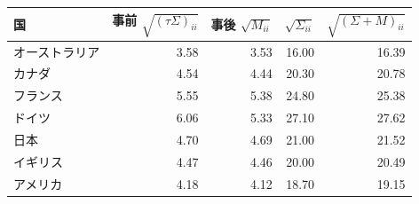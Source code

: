 \begin{tabular}{lrrrr}
\toprule
国 & 事前 $\sqrt{(\tau\Sigma)_{ii}}$ & 事後 $\sqrt{M_{ii}}$ & $\sqrt{\Sigma_{ii}}$ & $\sqrt{(\Sigma + M)_{ii}}$ \\
\midrule
オーストラリア & 3.58 & 3.53 & 16.00 & 16.39 \\
カナダ & 4.54 & 4.44 & 20.30 & 20.78 \\
フランス & 5.55 & 5.38 & 24.80 & 25.38 \\
ドイツ & 6.06 & 5.33 & 27.10 & 27.62 \\
日本 & 4.70 & 4.69 & 21.00 & 21.52 \\
イギリス & 4.47 & 4.46 & 20.00 & 20.49 \\
アメリカ & 4.18 & 4.12 & 18.70 & 19.15 \\
\bottomrule
\end{tabular}
